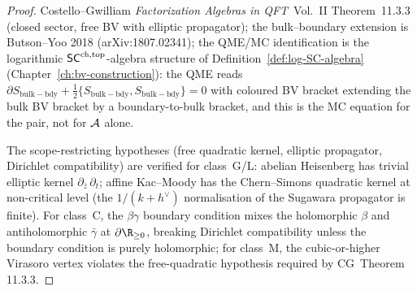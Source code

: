 \begin{proof}
Costello--Gwilliam \textit{Factorization Algebras in QFT}~Vol.~II
Theorem~11.3.3 (closed sector, free BV with elliptic propagator);
the bulk--boundary extension is Butson--Yoo 2018 (arXiv:1807.02341);
the QME/MC identification is the logarithmic $\mathsf{SC}^{\mathrm{ch},\mathrm{top}}$-algebra
structure of Definition~\ref{def:log-SC-algebra}
(Chapter~\ref{ch:bv-construction}): the QME reads
$\partial S_{\mathrm{bulk-bdy}} + \tfrac{1}{2}\{S_{\mathrm{bulk-bdy}},
S_{\mathrm{bulk-bdy}}\}=0$ with coloured BV bracket extending the bulk
BV bracket by a boundary-to-bulk bracket, and this is the MC equation
for the pair, not for $\mathcal{A}$ alone.

The scope-restricting hypotheses (free quadratic kernel, elliptic
propagator, Dirichlet compatibility) are verified for class~G/L:
abelian Heisenberg has trivial elliptic kernel
$\partial_{\bar z}\,\partial_t$; affine Kac--Moody has the
Chern--Simons quadratic kernel at non-critical level (the $1/(k+h^\vee)$
normalisation of the Sugawara propagator is finite). For class~C, the
$\beta\gamma$ boundary condition mixes the holomorphic
$\beta$ and antiholomorphic $\bar\gamma$ at $\partial\R_{\geq 0}$,
breaking Dirichlet compatibility unless the boundary condition is
purely holomorphic; for class~M, the cubic-or-higher Virasoro vertex
violates the free-quadratic hypothesis required by CG~Theorem 11.3.3.
\end{proof}

